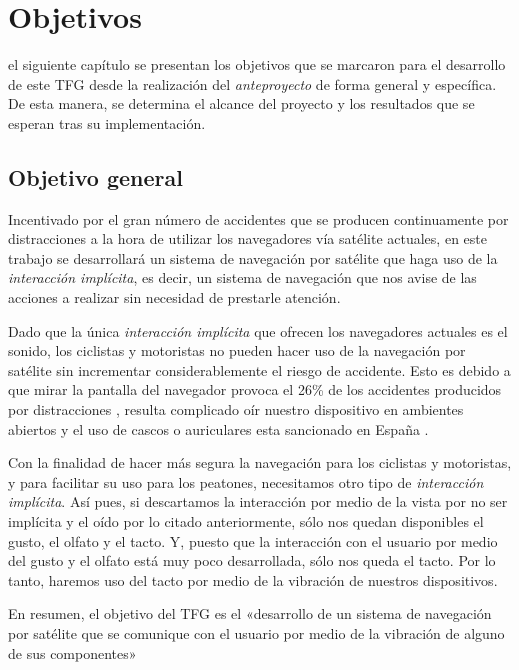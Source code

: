 \chapter{Objetivos}
\label{chap:objetivos}

 el siguiente capítulo se presentan los objetivos que se marcaron para el desarrollo de
este \acf{TFG} desde la realización del \emph{anteproyecto} de forma general y específica. De esta
manera, se determina el alcance del proyecto y los resultados que se esperan tras su implementación.

\section{Objetivo general}

Incentivado por el gran número de accidentes que se producen continuamente por distracciones a la
hora de utilizar los navegadores vía satélite actuales, en este trabajo se desarrollará un sistema
de navegación por satélite que haga uso de la \emph{interacción implícita}, es decir, un sistema de
navegación que nos avise de las acciones a realizar sin necesidad de prestarle atención.

Dado que la única \emph{interacción implícita} que ofrecen los navegadores actuales es el sonido,
los ciclistas y motoristas no pueden hacer uso de la navegación por satélite sin incrementar
considerablemente el riesgo de accidente. Esto es debido a que mirar la pantalla del navegador
provoca el 26\% de los accidentes producidos por distracciones \cite{Allianz14}, resulta complicado
oír nuestro dispositivo en ambientes abiertos y el uso de cascos o auriculares esta sancionado en
España \cite{Serrano14}.

Con la finalidad de hacer más segura la navegación para los ciclistas y motoristas, y para facilitar
su uso para los peatones, necesitamos otro tipo de \emph{interacción implícita}. Así pues, si
descartamos la interacción por medio de la vista por no ser implícita y el oído por lo citado
anteriormente, sólo nos quedan disponibles el gusto, el olfato y el tacto. Y, puesto que la
interacción con el usuario por medio del gusto y el olfato está muy poco desarrollada, sólo nos
queda el tacto. Por lo tanto, haremos uso del tacto por medio de la vibración de nuestros
dispositivos.

En resumen, el objetivo del \acf{TFG} es el «desarrollo de un sistema de navegación
  por satélite que se comunique con el usuario por medio de la vibración de alguno de sus
  componentes»


